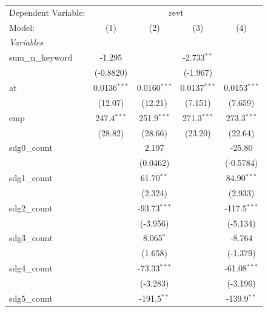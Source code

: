 
\begingroup
\centering
\begin{tabular}{lcccc}
   \tabularnewline \midrule \midrule
   Dependent Variable: & \multicolumn{4}{c}{revt}\\
   Model:            & (1)            & (2)            & (3)            & (4)\\  
   \midrule
   \emph{Variables}\\
   sum\_n\_keyword   & -1.295         &                & -2.733$^{**}$  &   \\   
                     & (-0.8820)      &                & (-1.967)       &   \\   
   at                & 0.0136$^{***}$ & 0.0160$^{***}$ & 0.0137$^{***}$ & 0.0153$^{***}$\\   
                     & (12.07)        & (12.21)        & (7.151)        & (7.659)\\   
   emp               & 247.4$^{***}$  & 251.9$^{***}$  & 271.3$^{***}$  & 273.3$^{***}$\\   
                     & (28.82)        & (28.66)        & (23.20)        & (22.64)\\   
   sdg0\_count       &                & 2.197          &                & -25.80\\   
                     &                & (0.0462)       &                & (-0.5784)\\   
   sdg1\_count       &                & 61.70$^{**}$   &                & 84.90$^{***}$\\   
                     &                & (2.324)        &                & (2.933)\\   
   sdg2\_count       &                & -93.73$^{***}$ &                & -117.5$^{***}$\\   
                     &                & (-3.956)       &                & (-5.134)\\   
   sdg3\_count       &                & 8.065$^{*}$    &                & -8.764\\   
                     &                & (1.658)        &                & (-1.379)\\   
   sdg4\_count       &                & -73.33$^{***}$ &                & -61.08$^{***}$\\   
                     &                & (-3.283)       &                & (-3.196)\\   
   sdg5\_count       &                & -191.5$^{**}$  &                & -139.9$^{**}$\\   

\end{tabular}
